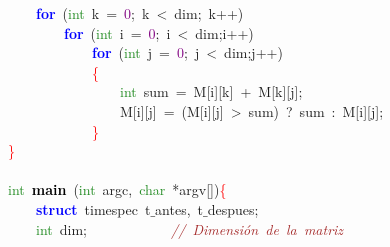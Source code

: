 \mbox{}\ \ \ \ \textbf{\textcolor{Blue}{for}}\ \textcolor{BrickRed}{(}\textcolor{ForestGreen}{int}\ k\ \textcolor{BrickRed}{=}\ \textcolor{Purple}{0}\textcolor{BrickRed}{;}\ k\ \textcolor{BrickRed}{\textless{}}\ dim\textcolor{BrickRed}{;}\ k\textcolor{BrickRed}{++)} \\
\mbox{}\ \ \ \ \ \ \ \ \textbf{\textcolor{Blue}{for}}\ \textcolor{BrickRed}{(}\textcolor{ForestGreen}{int}\ i\ \textcolor{BrickRed}{=}\ \textcolor{Purple}{0}\textcolor{BrickRed}{;}\ i\ \textcolor{BrickRed}{\textless{}}\ dim\textcolor{BrickRed}{;}i\textcolor{BrickRed}{++)} \\
\mbox{}\ \ \ \ \ \ \ \ \ \ \ \ \textbf{\textcolor{Blue}{for}}\ \textcolor{BrickRed}{(}\textcolor{ForestGreen}{int}\ j\ \textcolor{BrickRed}{=}\ \textcolor{Purple}{0}\textcolor{BrickRed}{;}\ j\ \textcolor{BrickRed}{\textless{}}\ dim\textcolor{BrickRed}{;}j\textcolor{BrickRed}{++)} \\
\mbox{}\ \ \ \ \ \ \ \ \ \ \ \ \textcolor{Red}{\{} \\
\mbox{}\ \ \ \ \ \ \ \ \ \ \ \ \ \ \ \ \textcolor{ForestGreen}{int}\ sum\ \textcolor{BrickRed}{=}\ M\textcolor{BrickRed}{[}i\textcolor{BrickRed}{][}k\textcolor{BrickRed}{]}\ \textcolor{BrickRed}{+}\ M\textcolor{BrickRed}{[}k\textcolor{BrickRed}{][}j\textcolor{BrickRed}{];}\ \ \ \ \ \ \ \  \\
\mbox{}\ \ \ \ \ \ \ \ \ \ \ \ \ \ \ \ M\textcolor{BrickRed}{[}i\textcolor{BrickRed}{][}j\textcolor{BrickRed}{]}\ \textcolor{BrickRed}{=}\ \textcolor{BrickRed}{(}M\textcolor{BrickRed}{[}i\textcolor{BrickRed}{][}j\textcolor{BrickRed}{]}\ \textcolor{BrickRed}{\textgreater{}}\ sum\textcolor{BrickRed}{)}\ \textcolor{BrickRed}{?}\ sum\ \textcolor{BrickRed}{:}\ M\textcolor{BrickRed}{[}i\textcolor{BrickRed}{][}j\textcolor{BrickRed}{];} \\
\mbox{}\ \ \ \ \ \ \ \ \ \ \ \ \textcolor{Red}{\}} \\
\mbox{}\textcolor{Red}{\}}\ \ \ \ \ \ \ \ \ \ \  \\
\mbox{} \\
\mbox{}\textcolor{ForestGreen}{int}\ \textbf{\textcolor{Black}{main}}\ \textcolor{BrickRed}{(}\textcolor{ForestGreen}{int}\ argc\textcolor{BrickRed}{,}\ \textcolor{ForestGreen}{char}\ \textcolor{BrickRed}{*}argv\textcolor{BrickRed}{[])}\textcolor{Red}{\{} \\
\mbox{}\ \ \ \ \textbf{\textcolor{Blue}{struct}}\ \textcolor{TealBlue}{timespec}\ t$\_$antes\textcolor{BrickRed}{,}\ t$\_$despues\textcolor{BrickRed}{;} \\
\mbox{}\ \ \ \ \textcolor{ForestGreen}{int}\ dim\textcolor{BrickRed}{;}\ \ \ \ \ \ \ \ \ \ \ \ \textit{\textcolor{Brown}{//\ Dimensión\ de\ la\ matriz}} \\
